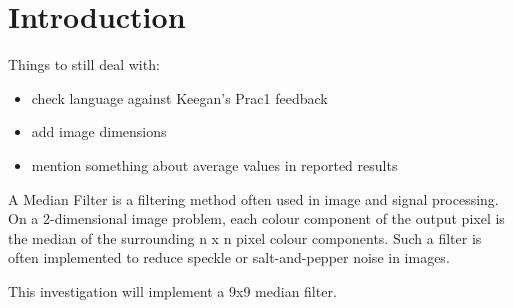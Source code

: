 \section{Introduction}
Things to still deal with:
\begin{itemize}
	\item check language against Keegan's Prac1 feedback
	\item add image dimensions
	\item mention something about average values in reported results
\end{itemize}
A Median Filter is a filtering method often used in image and signal processing. On a 2-dimensional image problem, each colour component of the output pixel is the median of the surrounding n x n pixel colour components. Such a filter is often implemented to reduce speckle or salt-and-pepper noise in images\cite{NSP}.

This investigation will implement a 9x9 median filter.

